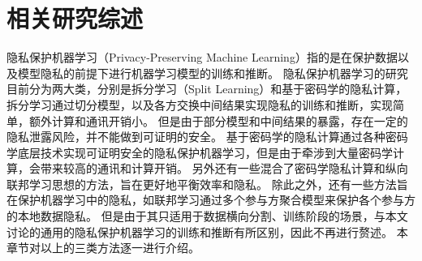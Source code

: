 \chapter{相关研究综述}
隐私保护机器学习（Privacy-Preserving Machine Learning）指的是在保护数据以及模型隐私的前提下进行机器学习模型的训练和推断。
%
隐私保护机器学习的研究目前分为两大类，分别是拆分学习（Split Learning）和基于密码学的隐私计算，
%
拆分学习通过切分模型，以及各方交换中间结果实现隐私的训练和推断，实现简单，额外计算和通讯开销小。
%
但是由于部分模型和中间结果的暴露，存在一定的隐私泄露风险，并不能做到可证明的安全。
%
基于密码学的隐私计算通过各种密码学底层技术实现可证明安全的隐私保护机器学习，但是由于牵涉到大量密码学计算，会带来较高的通讯和计算开销。
%
另外还有一些混合了密码学隐私计算和纵向联邦学习思想的方法，旨在更好地平衡效率和隐私。
%
除此之外，还有一些方法旨在保护机器学习中的隐私，如联邦学习通过多个参与方聚合模型来保护各个参与方的本地数据隐私。
%
但是由于其只适用于数据横向分割、训练阶段的场景，与本文讨论的通用的隐私保护机器学习的训练和推断有所区别，因此不再进行赘述。
%
本章节对以上的三类方法逐一进行介绍。



